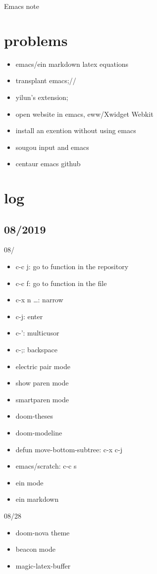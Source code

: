 \documentclass[11pt]{article}
\author{user name}
\date{\today}
\title{}
\begin{document}
\tableofcontents

Emacs note
\section{problems}
\label{sec:orge5e3682}
\begin{itemize}
\item emacs/ein markdown latex equations
\item transplant emacs;//
\item yilun's extension;
\item open website in emacs, eww/Xwidget Webkit
\item install an exention without using emacs
\item sougou input and emacs
\item centaur emacs github
\end{itemize}
\section{log}
\label{sec:orga9c08ec}
\subsection{08/2019}
\label{sec:org95ed809}
08/
\begin{itemize}
\item c-c j: go to function in the repository
\item c-c f: go to function in the file
\item c-x n \ldots{}: narrow
\item c-j: enter
\item c-': multicusor
\item c-;: backspace
\item electric pair mode
\item show paren mode
\item smartparen mode
\item doom-theses
\item doom-modeline
\item defun move-bottom-subtree: c-x c-j
\item emacs/scratch: c-c s
\item ein mode
\item ein markdown
\end{itemize}

08/28
\begin{itemize}
\item doom-nova theme
\item beacon mode
\item magic-latex-buffer
\end{itemize}
\end{document}
